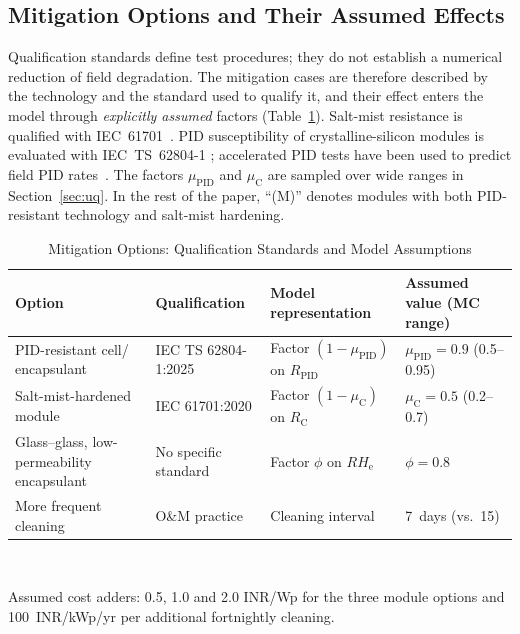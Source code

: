 \documentclass[journal]{IEEEtran}
\newcommand{\RHe}{\mathit{RH}_{\mathrm{e}}}
\begin{document}
\subsection{Mitigation Options and Their Assumed Effects}\label{sec:mit}
Qualification standards define test procedures; they do not establish a numerical reduction of field degradation. The
mitigation cases are therefore described by the technology and the standard used to qualify it, and their effect
enters the model through \emph{explicitly assumed} factors (Table~\ref{tab:mitstd}). Salt-mist resistance is qualified
with IEC~61701~\cite{iec61701}. PID susceptibility of crystalline-silicon modules is evaluated with IEC~TS~62804-1
\cite{iec62804}; accelerated PID tests have been used to predict field PID rates~\cite{li2025}. The factors
$\mu_{\mathrm{PID}}$ and $\mu_{\mathrm{C}}$ are sampled over wide ranges in Section~\ref{sec:uq}. In the rest of the
paper, ``(M)'' denotes modules with both PID-resistant technology and salt-mist hardening.

\begin{table}[!t]
\caption{Mitigation Options: Qualification Standards and Model Assumptions}
\label{tab:mitstd}
\centering
\scriptsize
\setlength{\tabcolsep}{2pt}
\begin{tabular}{@{}p{17mm}p{18mm}p{21mm}p{17mm}@{}}
\toprule
Option & Qualification & Model representation & Assumed value (MC range) \\
\midrule
PID-resistant cell/ encapsulant & IEC TS 62804-1:2025 & Factor $(1-\mu_{\mathrm{PID}})$ on $R_{\mathrm{PID}}$ & $\mu_{\mathrm{PID}}=0.9$ (0.5--0.95) \\
Salt-mist-hardened module & IEC 61701:2020 & Factor $(1-\mu_{\mathrm{C}})$ on $R_{\mathrm{C}}$ & $\mu_{\mathrm{C}}=0.5$ (0.2--0.7) \\
Glass--glass, low-permeability encapsulant & No specific standard & Factor $\phi$ on $\RHe$ & $\phi=0.8$ \\
More frequent cleaning & O\&M practice & Cleaning interval & 7~days (vs.\ 15) \\
\bottomrule
\end{tabular}\\[2pt]
\parbox{\columnwidth}{\scriptsize Assumed cost adders: 0.5, 1.0 and 2.0 INR/Wp for the three module options and
100~INR/kWp/yr per additional fortnightly cleaning.}
\end{table}
\end{document}
